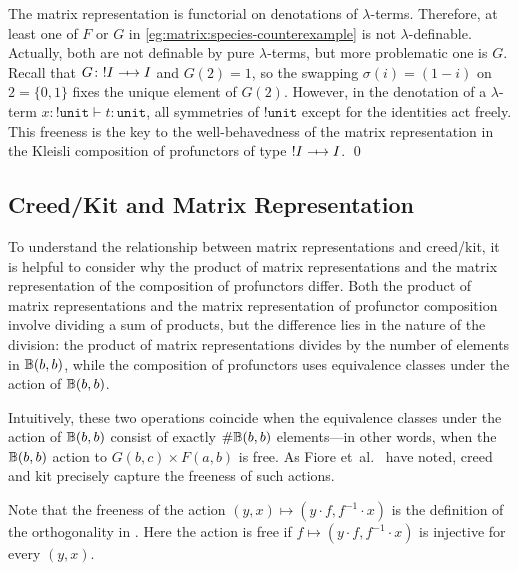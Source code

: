 \begin{remark}
    The matrix representation is functorial on denotations of \( \lambda \)-terms.
    Therefore, at least one of \( F \) or \( G \) in \cref{eg:matrix:species-counterexample} is not \( \lambda \)-definable.
    Actually, both are not definable by pure \( \lambda \)-terms, but more problematic one is \( G \).
    Recall that \( G \colon {!}I \profarrow I \) and \( G(2) = 1 \), so the swapping \( \sigma(i) = (1-i) \) on \( 2 = \{ 0,1 \} \) fixes the unique element of \( G(2) \).
    However, in the denotation of a \( \lambda \)-term \( x \colon {!}\mathtt{unit} \vdash t \colon \mathtt{unit} \), all symmetries of \( {!}\mathtt{unit} \) except for the identities act freely.
    This freeness is the key to the well-behavedness of the matrix representation in the Kleisli composition of profunctors of type \( {!}I \profarrow I \).
    \qed
\end{remark}


\subsection{Creed/Kit and Matrix Representation}
To understand the relationship between matrix representations and creed/kit, it is helpful to consider why the product of matrix representations and the matrix representation of the composition of profunctors differ. Both the product of matrix representations and the matrix representation of profunctor composition involve dividing a sum of products, but the difference lies in the nature of the division: the product of matrix representations divides by the number of elements in 
\( \mathbb{B}(b,b) \), while the composition of profunctors uses equivalence classes under the action of \( \mathbb{B}(b,b) \).

Intuitively, these two operations coincide when the equivalence classes under the action of \( \mathbb{B}(b,b) \) consist of exactly \( \#\mathbb{B}(b,b) \) elements---in other words, when the \( \mathbb{B}(b,b) \) action to \( G(b,c) \times F(a,b) \) is free.
As Fiore et~al.~\cite{Fiore2024} have noted, creed and kit precisely capture the freeness of such actions.

Note that the freeness of the action \( (y,x) \mapsto (y \cdot f, f^{-1} \cdot x) \) is the definition of the orthogonality in \cite[Definition~7.8]{Fiore2024}.
Here the action is free if \( f \mapsto (y \cdot f, f^{-1} \cdot x) \) is injective for every \( (y,x) \).

